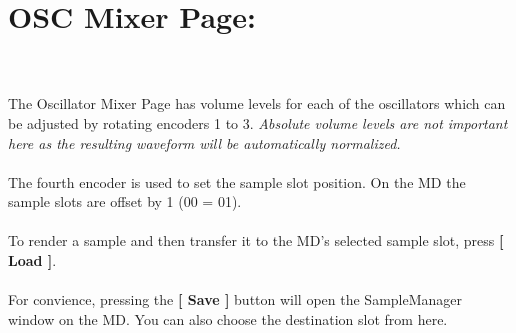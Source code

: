 \section{OSC Mixer Page:}
\\\\
The Oscillator Mixer Page has volume levels for each of the oscillators which can be adjusted by rotating encoders 1 to 3. \textit{Absolute volume levels are not important here as the resulting waveform will be automatically normalized.}\\
\\The fourth encoder is used to set the sample slot position. On the MD the sample slots are offset by 1 (00 = 01).\\
\\
To render a sample and then transfer it to the MD's selected sample slot, press \textbf{[ Load ]}.\\
\\
For convience, pressing the \textbf{[ Save ]} button will open the SampleManager window on the MD. You can also choose the destination slot from here.

